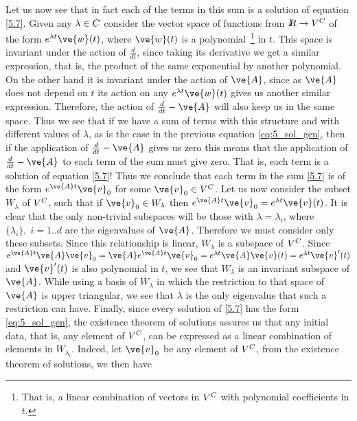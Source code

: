 Let us now see that in fact each of the terms in this sum
is a solution of equation \ref{5.7}. 
Given any $\lambda \in C$ consider the vector space
of functions from $\mbox{\sl {l$\!\!\!\;\:\!$R}} \to V^{C}$ of the form $e^{\lambda t} \ve{w}(t)$,
where $\ve{w}(t)$ is a polynomial~\footnote{That is, a linear combination
of vectors in $V^{C}$ with polynomial coefficients in $t$.} in $t$. 
This space is invariant
under the action of $\frac{d}{dt}$, since taking its derivative we get
a similar expression, that is, the product of the same exponential by another
polynomial. 
%
On the other hand it is invariant under the action of
$\ve{A}$, since as $\ve{A}$ does not depend on $t$ its action on any
$e^{\lambda t} \ve{w}(t)$ gives us another similar expression.
%
Therefore, the action of $\frac{d}{dt} -\ve{A}$ will also keep us
in the same space.  
%
Thus we see that if we have a sum of terms with this structure
and with different values of $\lambda$, as is the case in the previous equation
\ref{eq:5_sol_gen}, then if the application of 
$\frac{d}{dt} -\ve{A}$ gives us zero this means that the application of 
$\frac{d}{dt} -\ve{A}$ to each term of
the sum must give zero. That is, each term is a solution of
equation \ref{5.7}!
Thus we conclude that each term in the
 sum \ref{5.7} is of the form $e^{\ve{A}t} \ve{v}_0$ for some
$\ve{v}_0 \in V^{\Complex}$.
%
Let us now consider the subset $W_{\lambda}$ of $V^{C}$, such that
if $\ve{v}_0 \in W_{\lambda}$ then 
$e^{\ve{A}t} \ve{v}_0 = e^{\lambda t} \ve{v}(t)$.
It is clear that the only non-trivial subspaces will be those
with $\lambda = \lambda_i$, where $\{\lambda_i\},\;i=1..d$ are the eigenvalues
of $\ve{A}$. Therefore we must consider only these subsets.
% 
Since this relationship is linear, $W_{\lambda}$ is a subspace of $V^{C}$. 
Since 
$e^{\ve{A}t} \ve{A} \ve{v}_0 = \ve{A} e^{\ve{A}t} \ve{v}_0 
= e^{\lambda t} \ve{A} \ve{v}(t) = e^{\lambda t} \ve{v}'(t)$
and $\ve{v}'(t)$ is also polynomial in $t$, we see
that $W_{\lambda}$ is an invariant subspace of $\ve{A}$.
While using a basis of $W_{\lambda}$ in which the 
restriction to that space of $\ve{A}$ is upper triangular,
we see that $\lambda$ is the only eigenvalue that such a restriction
can have. Finally, since every solution of \ref{5.7} has
the form \ref{eq:5_sol_gen}, the existence theorem of solutions assures us
that any initial data,
that is, any element of $V^{C}$, can be expressed
as a linear combination of elements in $W_{\lambda_i}$. 
Indeed, let $\ve{v}_0$ be any element of $V^{C}$,
from the existence theorem of solutions, we then have 
